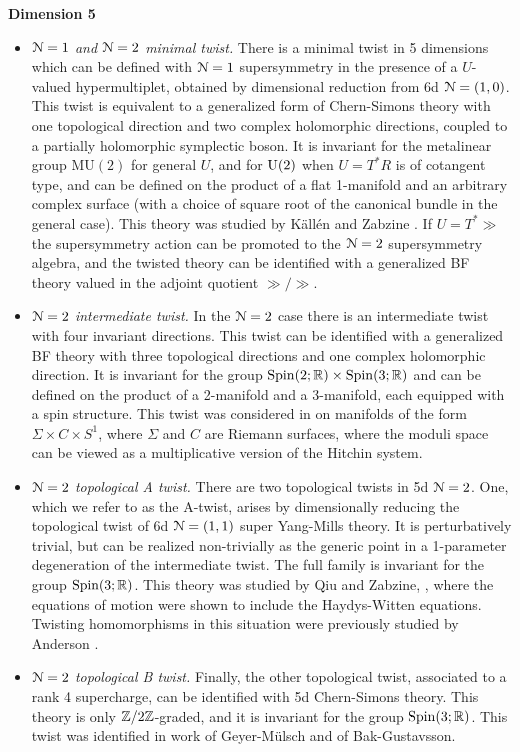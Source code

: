 \documentclass[10pt, oneside]{article}
\newcommand{\MU}{\mathrm{MU}}
\begin{document}
\textbf{Dimension 5}
\begin{itemize}
 \item \emph{$\mathcal{N}=1$ and $\mathcal{N}=2$ minimal twist.}  There is a minimal twist in 5 dimensions which can be defined with $\mathcal{N}=1$ supersymmetry in the presence of a $U$-valued hypermultiplet, obtained by dimensional reduction from 6d $\mathcal{N}=(1,0)$.  This twist is equivalent to a generalized form of Chern-Simons theory with one topological direction and two complex holomorphic directions, coupled to a partially holomorphic symplectic boson.  It is invariant for the metalinear group $\MU(2)$ for general $U$, and for $\mathrm{U}(2)$ when $U = T^*R$ is of cotangent type, and can be defined on the product of a flat 1-manifold and an arbitrary complex surface (with a choice of square root of the canonical bundle in the general case).  This theory was studied by K\"all\'en and Zabzine  \cite{KallenZabzine}.  If $U = T^*\gg$ the supersymmetry action can be promoted to the $\mathcal{N}=2$ supersymmetry algebra, and the twisted theory can be identified with a generalized BF theory valued in the adjoint quotient $\gg/\gg$.
 \item \emph{$\mathcal{N}=2$ intermediate twist.} In the $\mathcal{N}=2$ case there is an intermediate twist with four invariant directions.  This twist can be identified with a generalized BF theory with three topological directions and one complex holomorphic direction.  It is invariant for the group $\mathrm{Spin}(2;\mathbb R) \times \mathrm{Spin}(3;\mathbb R)$ and can be defined on the product of a 2-manifold and a 3-manifold, each equipped with a spin structure.  This twist was considered in \cite{ElliottPestun} on manifolds of the form $\Sigma \times C \times S^1$, where $\Sigma$ and $C$ are Riemann surfaces, where the moduli space can be viewed as a multiplicative version of the Hitchin system.
 \item \emph{$\mathcal{N}=2$ topological A twist.} There are two topological twists in 5d $\mathcal{N}=2$.  One, which we refer to as the A-twist, arises by dimensionally reducing the topological twist of 6d $\mathcal{N}=(1,1)$ super Yang-Mills theory.  It is perturbatively trivial, but can be realized non-trivially as the generic point in a 1-parameter degeneration of the intermediate twist.  The full family is invariant for the group $\mathrm{Spin}(3;\mathbb R)$.  This theory was studied by Qiu and Zabzine, \cite{QiuZabzine}, where the equations of motion were shown to include the Haydys-Witten equations.  Twisting homomorphisms in this situation were previously studied by Anderson \cite{Anderson}.
 \item \emph{$\mathcal{N}=2$ topological B twist.} Finally, the other topological twist, associated to a rank 4 supercharge, can be identified with 5d Chern-Simons theory.  This theory is only $\mathbb Z/2\mathbb Z$-graded, and it is invariant for the group $\mathrm{Spin}(3;\mathbb R)$.  This twist was identified in work of Geyer-M\"ulsch and of Bak-Gustavsson\cite{GeyerMuelsch, BakGustavsson1,BakGustavsson2}.
\end{itemize}
\end{document}
